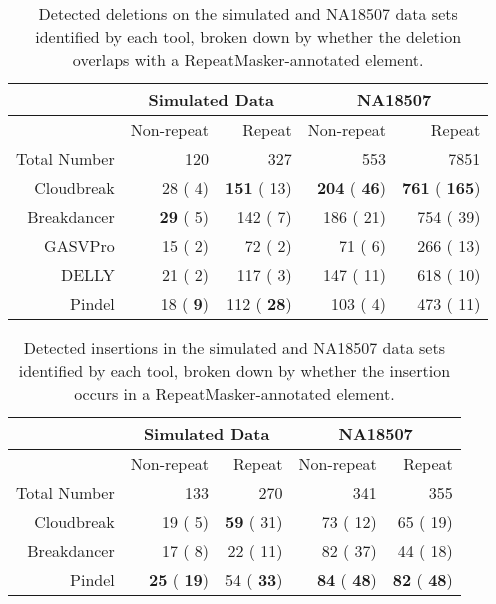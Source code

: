 \documentclass[11pt]{article}
\begin{document}
\begin{table}[b]
\begin{center}
\begin{tabular}{rrr|rr}
 & \multicolumn{2}{c}{Simulated Data} & \multicolumn{2}{c}{NA18507} \\
\hline
 &  Non-repeat & Repeat  &  Non-repeat & Repeat \\ 
 Total Number & 120 & 327 & 553 & 7851 \\ 
  \hline
  Cloudbreak  &   28 (   4) & \textbf{ 151} (  13) & \textbf{ 204} (\textbf{  46}) & \textbf{ 761} (\textbf{ 165}) \\ 
  Breakdancer & \textbf{  29} (   5) &  142 (   7) &  186 (  21) &  754 (  39) \\
  GASVPro     &   15 (   2) &   72 (   2) &   71 (   6) &  266 (  13) \\
  DELLY       &   21 (   2) &  117 (   3) &  147 (  11) &  618 (  10) \\
  Pindel      &   18 (\textbf{   9}) &  112 (\textbf{  28}) &  103 (   4) &  473 (  11) \\ 
   \hline
\end{tabular}
\end{center}
\caption{Detected deletions on the simulated and NA18507 data sets identified by each tool, broken down by whether the deletion overlaps with a RepeatMasker-annotated element.}
\label{deletionRepmaskpreds}
\end{table}

\begin{table}[b]
\begin{center}
\begin{tabular}{rrr|rr}
 & \multicolumn{2}{c}{Simulated Data} & \multicolumn{2}{c}{NA18507} \\
\hline
 &  Non-repeat & Repeat  &  Non-repeat & Repeat \\ 
 Total Number & 133 & 270 & 341 & 355 \\ 
  \hline
  Cloudbreak  &   19 (   5) & \textbf{  59} (  31) &   73 (  12) &   65 (  19) \\ 
  Breakdancer &   17 (   8) &   22 (  11) &   82 (  37) &   44 (  18) \\
  Pindel      & \textbf{  25} (\textbf{  19}) &   54 (\textbf{  33}) & \textbf{  84} (\textbf{  48}) & \textbf{  82} (\textbf{  48}) \\ 
   \hline
\end{tabular}
\end{center}
\caption{Detected insertions in the simulated and NA18507 data sets identified by each tool, broken down by whether the insertion occurs in a RepeatMasker-annotated element.}
\label{insertionRepmaskpreds}
\end{table}
\end{document}
